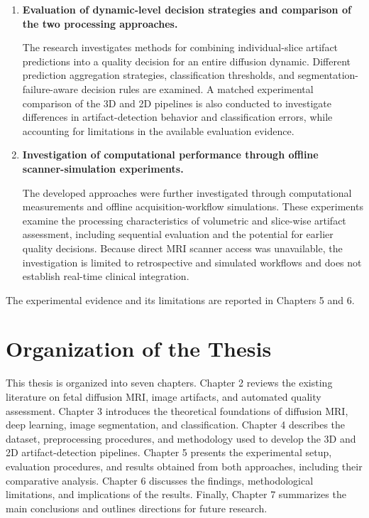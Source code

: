 \begin{enumerate}
    Both pipelines incorporate automatic fetal-brain localization as an essential processing stage. The research evaluates the relationship between segmentation quality, brain-region extraction, and subsequent artifact classification. In particular, the 2D experiments examine unsuccessful crop generation, differences between reference and predicted brain regions, and the effects of segmentation failures on classification decisions. The investigation also considers the limitations introduced when dynamic-level artifact annotations are used as slice-level classification targets.

    \item \textbf{Evaluation of dynamic-level decision strategies and comparison of the two processing approaches.}

    The research investigates methods for combining individual-slice artifact predictions into a quality decision for an entire diffusion dynamic. Different prediction aggregation strategies, classification thresholds, and segmentation-failure-aware decision rules are examined. A matched experimental comparison of the 3D and 2D pipelines is also conducted to investigate differences in artifact-detection behavior and classification errors, while accounting for limitations in the available evaluation evidence.

    \item \textbf{Investigation of computational performance through offline scanner-simulation experiments.}

    The developed approaches were further investigated through computational measurements and offline acquisition-workflow simulations. These experiments examine the processing characteristics of volumetric and slice-wise artifact assessment, including sequential evaluation and the potential for earlier quality decisions. Because direct MRI scanner access was unavailable, the investigation is limited to retrospective and simulated workflows and does not establish real-time clinical integration.
\end{enumerate}

The experimental evidence and its limitations are reported in Chapters 5 and 6.

\section{Organization of the Thesis}

This thesis is organized into seven chapters. Chapter 2 reviews the existing literature on fetal diffusion MRI, image artifacts, and automated quality assessment. Chapter 3 introduces the theoretical foundations of diffusion MRI, deep learning, image segmentation, and classification. Chapter 4 describes the dataset, preprocessing procedures, and methodology used to develop the 3D and 2D artifact-detection pipelines. Chapter 5 presents the experimental setup, evaluation procedures, and results obtained from both approaches, including their comparative analysis. Chapter 6 discusses the findings, methodological limitations, and implications of the results. Finally, Chapter 7 summarizes the main conclusions and outlines directions for future research.
